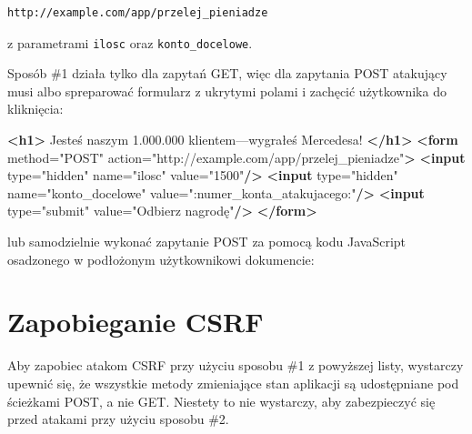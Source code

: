 \documentclass[12pt,polish,a4paper,]{report}
\newenvironment{Shaded}{}{}
\newcommand{\KeywordTok}[1]{\textcolor[rgb]{0.00,0.44,0.13}{\textbf{{#1}}}}
\newcommand{\DataTypeTok}[1]{\textcolor[rgb]{0.56,0.13,0.00}{{#1}}}
\newcommand{\DecValTok}[1]{\textcolor[rgb]{0.25,0.63,0.44}{{#1}}}
\newcommand{\StringTok}[1]{\textcolor[rgb]{0.25,0.44,0.63}{{#1}}}
\newcommand{\OtherTok}[1]{\textcolor[rgb]{0.00,0.44,0.13}{{#1}}}
\newcommand{\VariableTok}[1]{\textcolor[rgb]{0.10,0.09,0.49}{{#1}}}
\newcommand{\OperatorTok}[1]{\textcolor[rgb]{0.40,0.40,0.40}{{#1}}}
\newcommand{\AttributeTok}[1]{\textcolor[rgb]{0.49,0.56,0.16}{{#1}}}
\newcommand{\NormalTok}[1]{{#1}}
\begin{document}
\begin{enumerate}
\begin{verbatim}
http://example.com/app/przelej_pieniadze
\end{verbatim}

  z parametrami \texttt{ilosc} oraz \texttt{konto\_docelowe}.

  Sposób \#1 działa tylko dla zapytań GET, więc dla zapytania POST
  atakujący musi albo spreparować formularz z ukrytymi polami i zachęcić
  użytkownika do kliknięcia:

\begin{Shaded}
\begin{Highlighting}[]
\KeywordTok{<h1>} \NormalTok{Jesteś naszym 1.000.000 klientem---wygrałeś Mercedesa! }\KeywordTok{</h1>}
\KeywordTok{<form}\OtherTok{ method=}\StringTok{"POST"}\OtherTok{ action=}\StringTok{"http://example.com/app/przelej_pieniadze"}\KeywordTok{>}
    \KeywordTok{<input}\OtherTok{ type=}\StringTok{"hidden"}\OtherTok{ name=}\StringTok{"ilosc"}\OtherTok{ value=}\StringTok{"1500"}\KeywordTok{/>}
    \KeywordTok{<input}\OtherTok{ type=}\StringTok{"hidden"}\OtherTok{ name=}\StringTok{"konto_docelowe"} 
\OtherTok{        value=}\StringTok{":numer_konta_atakujacego:"}\KeywordTok{/>}
    \KeywordTok{<input}\OtherTok{ type=}\StringTok{"submit"}\OtherTok{ value=}\StringTok{"Odbierz nagrodę"}\KeywordTok{/>}
\KeywordTok{</form>}
\end{Highlighting}
\end{Shaded}

  lub samodzielnie wykonać zapytanie POST za pomocą kodu JavaScript
  osadzonego w podłożonym użytkownikowi dokumencie:

\begin{Shaded}
\end{Shaded}
\end{enumerate}

\section{Zapobieganie CSRF}\label{zapobieganie-csrf}

Aby zapobiec atakom CSRF przy użyciu sposobu \#1 z powyższej listy,
wystarczy upewnić się, że wszystkie metody zmieniające stan aplikacji są
udostępniane pod ścieżkami POST, a nie GET. Niestety to nie wystarczy,
aby zabezpieczyć się przed atakami przy użyciu sposobu \#2.
\end{document}
